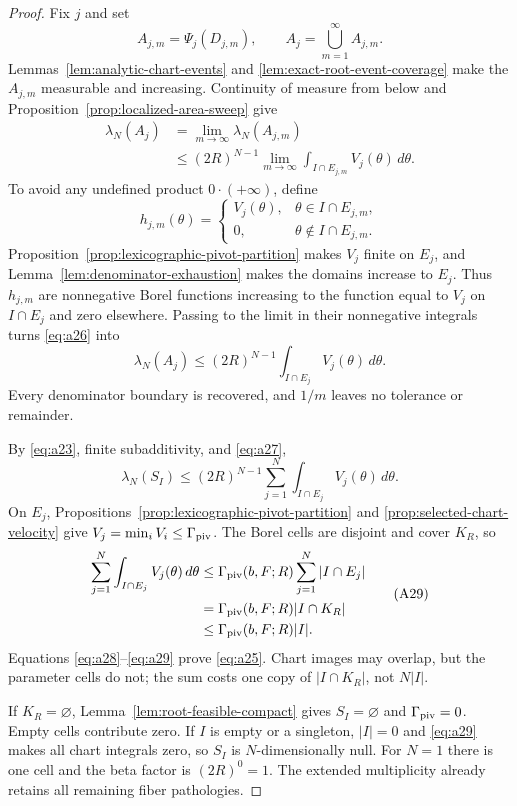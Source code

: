 \begin{proof}
Fix $j$ and set
\[
A_{j,m}=\Psi_j(D_{j,m}),
\qquad A_j=\bigcup_{m=1}^\infty A_{j,m}.
\]
Lemmas~\ref{lem:analytic-chart-events} and
\ref{lem:exact-root-event-coverage} make the $A_{j,m}$ measurable and
increasing.  Continuity of measure from below and
Proposition~\ref{prop:localized-area-sweep} give
\[
\begin{aligned}
\lambda_N(A_j)
&=\lim_{m\to\infty}\lambda_N(A_{j,m})\\
&\leq(2R)^{N-1}\lim_{m\to\infty}
 \int_{I\cap E_{j,m}}V_j(\theta)\,d\theta.
\end{aligned}
\tag{A26}\label{eq:a26}
\]
To avoid any undefined product $0\cdot(+\infty)$, define
\[
h_{j,m}(\theta)=
\begin{cases}
V_j(\theta),&\theta\in I\cap E_{j,m},\\
0,&\theta\notin I\cap E_{j,m}.
\end{cases}
\]
Proposition~\ref{prop:lexicographic-pivot-partition} makes $V_j$ finite on
$E_j$, and Lemma~\ref{lem:denominator-exhaustion} makes the domains increase
to $E_j$.  Thus $h_{j,m}$ are nonnegative Borel functions increasing to the
function equal to $V_j$ on $I\cap E_j$ and zero elsewhere.  Passing to the
limit in their nonnegative integrals turns \eqref{eq:a26} into
\[
\lambda_N(A_j)
\leq(2R)^{N-1}\int_{I\cap E_j}V_j(\theta)\,d\theta.
\tag{A27}\label{eq:a27}
\]
Every denominator boundary is recovered, and $1/m$ leaves no tolerance or
remainder.

By \eqref{eq:a23}, finite subadditivity, and \eqref{eq:a27},
\[
\lambda_N(S_I)
\leq(2R)^{N-1}\sum_{j=1}^N
\int_{I\cap E_j}V_j(\theta)\,d\theta.
\tag{A28}\label{eq:a28}
\]
On $E_j$, Propositions~\ref{prop:lexicographic-pivot-partition} and
\ref{prop:selected-chart-velocity} give
$V_j=\min_iV_i\leq\Gamma_{\rm piv}$.  The Borel cells are disjoint and
cover $K_R$, so
\[
\begin{aligned}
\sum_{j=1}^N\int_{I\cap E_j}V_j(\theta)\,d\theta
&\leq\Gamma_{\rm piv}(b,F;R)\sum_{j=1}^N|I\cap E_j|\\
&=\Gamma_{\rm piv}(b,F;R)|I\cap K_R|\\
&\leq\Gamma_{\rm piv}(b,F;R)|I|.
\end{aligned}
\tag{A29}\label{eq:a29}
\]
Equations \eqref{eq:a28}--\eqref{eq:a29} prove \eqref{eq:a25}.  Chart
images may overlap, but the parameter cells do not; the sum costs one copy
of $|I\cap K_R|$, not $N|I|$.

If $K_R=\varnothing$, Lemma~\ref{lem:root-feasible-compact} gives
$S_I=\varnothing$ and $\Gamma_{\rm piv}=0$.  Empty cells contribute zero.
If $I$ is empty or a singleton, $|I|=0$ and \eqref{eq:a29} makes all chart
integrals zero, so $S_I$ is $N$-dimensionally null.  For $N=1$ there is one
cell and the beta factor is $(2R)^0=1$.  The extended multiplicity already
retains all remaining fiber pathologies.
\end{proof}

